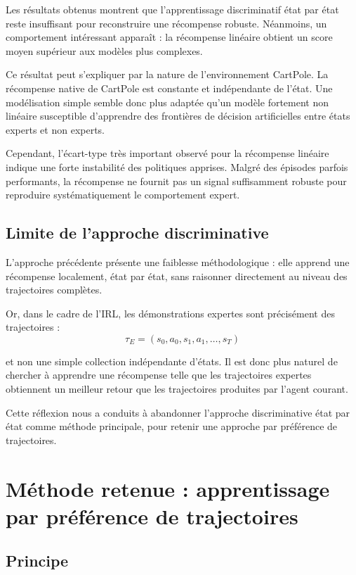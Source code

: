 Les résultats obtenus montrent que l'apprentissage discriminatif état par état reste insuffisant pour reconstruire une récompense robuste. Néanmoins, un comportement intéressant apparaît : la récompense linéaire obtient un score moyen supérieur aux modèles plus complexes.

Ce résultat peut s'expliquer par la nature de l'environnement CartPole. La récompense native de CartPole est constante et indépendante de l'état. Une modélisation simple semble donc plus adaptée qu'un modèle fortement non linéaire susceptible d'apprendre des frontières de décision artificielles entre états experts et non experts.

Cependant, l'écart-type très important observé pour la récompense linéaire indique une forte instabilité des politiques apprises. Malgré des épisodes parfois performants, la récompense ne fournit pas un signal suffisamment robuste pour reproduire systématiquement le comportement expert.

\subsection{Limite de l’approche discriminative}

L’approche précédente présente une faiblesse méthodologique : elle apprend une récompense localement, état par état, sans raisonner directement au niveau des trajectoires complètes.

Or, dans le cadre de l’IRL, les démonstrations expertes sont précisément des trajectoires :
\[
\tau_E = (s_0,a_0,s_1,a_1,\dots,s_T)
\]

et non une simple collection indépendante d’états. Il est donc plus naturel de chercher à apprendre une récompense telle que les trajectoires expertes obtiennent un meilleur retour que les trajectoires produites par l’agent courant.

Cette réflexion nous a conduits à abandonner l’approche discriminative état par état comme méthode principale, pour retenir une approche par préférence de trajectoires.

\section{Méthode retenue : apprentissage par préférence de trajectoires}

\subsection{Principe}

